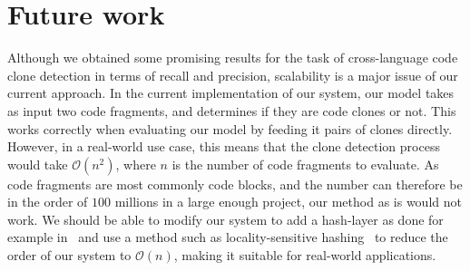 \section{Future work}
Although we obtained some promising results for the task of cross-language code
clone detection in terms of recall and precision, scalability is a major issue
of our current approach. In the current implementation of our system, our model
takes as input two code fragments, and determines if they are code clones or
not. This works correctly when evaluating our model by feeding it pairs of
clones directly. However, in a real-world use case, this means that the clone
detection process would take $\mathcal{O}\left(n^2\right)$, where $n$ is the
number of code fragments to evaluate. As code fragments are most commonly code
blocks, and the number can therefore be in the order of $100$ millions in a
large enough project, our method as is would not work. We should be able to
modify our system to add a hash-layer as done for example
in~\cite{ijcai2017-423} and use a method such as locality-sensitive
hashing~\cite{Datar:2004:LHS:997817.997857} to reduce the order of our system to
$\mathcal{O}(n)$, making it suitable for real-world applications.
